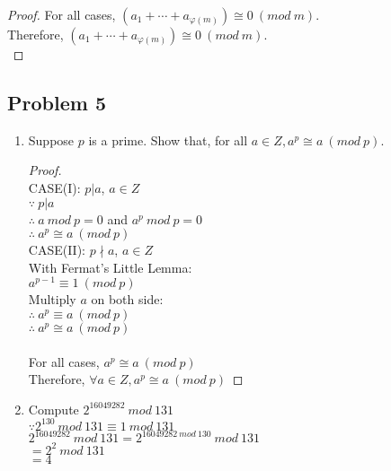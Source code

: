 \documentclass[paper=a4, fontsize=11pt]{scrartcl} %
\numberwithin{equation}{section} %
\numberwithin{figure}{section} %
\newcommand{\problem}[1]{\subsection *{Problem #1}}
\newcommand{\pnl}{$ $\newline\\}
\begin{document}
\begin{enumerate}
\begin{proof}
For all cases, $(a_1 +\cdots+ a_{\varphi(m)}) \cong 0\ (mod\ m)$.\\
Therefore, $(a_1 +\cdots+ a_{\varphi(m)}) \cong 0\ (mod\ m)$.\\
\end{proof}
\end{enumerate}

\problem 5 
\begin{enumerate}
\item Suppose $p$ is a prime. Show that, for all $a \in Z, a^p \cong a\ (mod\ p)$.
\begin{proof}
\pnl
CASE(I): $p | a$, $a \in Z$\\
$\because\ p | a$\\
$\therefore\ a\ mod\ p = 0$ and $a^p\ mod\ p = 0$\\
$\therefore\ a^p \cong a\ (mod\ p)$\\
CASE(II): $p \nmid a$, $a \in Z$\\
With Fermat's Little Lemma:\\
$a^{p - 1} \equiv 1\ (mod\ p)$\\
Multiply $a$ on both side:\\
$\therefore\ a^p \equiv a\ (mod\ p)$\\
$\therefore\ a^p \cong a\ (mod\ p)$\\\\

For all cases, $a^p \cong a\ (mod\ p)$\\
Therefore, $\forall a \in Z, a^p \cong a\ (mod\ p)$

\end{proof}
\item Compute $2^{16049282}\ mod\ 131$\\
$\because 2^{130}\ mod\ 131 \equiv 1\ mod \ 131$\\
$2^{16049282}\ mod\ 131 = 2^{16049282\ mod\ 130}\ mod\ 131$\\
$= 2^2\ mod\ 131$\\
$= 4$\\
\end{enumerate}

\end{document}
